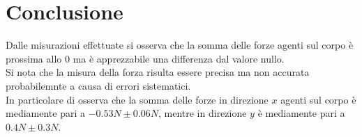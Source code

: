 \section*{Conclusione}

Dalle misurazioni effettuate si osserva che la somma delle forze agenti sul corpo è prossima allo 0 ma è apprezzabile una differenza dal valore nullo.\\
Si nota che la misura della forza risulta essere precisa ma non accurata probabilemnte a causa di errori sistematici.\\
In particolare di osserva che la somma delle forze in direzione $x$ agenti sul corpo è mediamente pari a $-0.53 N \pm 0.06N$, mentre in direzione $y$ è mediamente pari a $0.4 N \pm 0.3N$.\\ 

